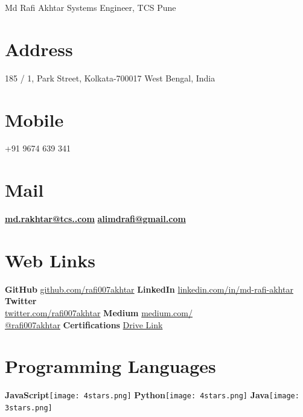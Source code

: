 \documentclass[]{friggeri-cv}
\begin{document}
\header {} {Md Rafi Akhtar}
      {Systems Engineer, TCS Pune}
      

\begin{aside}
  \section{Address}
    185 / 1, Park Street, Kolkata-700017
    West Bengal, India
    ~
  \section{Mobile}
    +91 9674 639 341
    ~
  \section{Mail}
    \href{mailto:md.rakhtar@tcs.com}{\textbf{md.rakhtar@tcs..com}}
    \href{mailto:alimdrafi@gmail.com}{\textbf{alimdrafi@gmail.com}}
    ~
  \section{Web Links}
    \textbf{GitHub} \href{https://github.com/rafi007akhtar}{github.com/rafi007akhtar}
    \textbf{LinkedIn} \href{https://www.linkedin.com/in/md-rafi-akhtar}{linkedin.com/in/md-rafi-akhtar}
    \textbf{Twitter} \href{https://twitter.com/rafi007akhtar}{\\twitter.com/rafi007akhtar}
    \textbf{Medium}
    \href{https://medium.com/@rafi007akhtar}{medium.com/\\@rafi007akhtar}
    \textbf{Certifications}
    \href{https://drive.google.com/open?id=1yXkhjvAwEwfuUrkH_Ks33mNrBGWDfhWL}{Drive Link}
    ~
  \section{Programming Languages}
    \textbf{JavaScript}\texttt{[image: 4stars.png]}
    \textbf{Python}\texttt{[image: 4stars.png]}
    \textbf{Java}\texttt{[image: 3stars.png]}
    ~
\end{aside}
\end{document}
